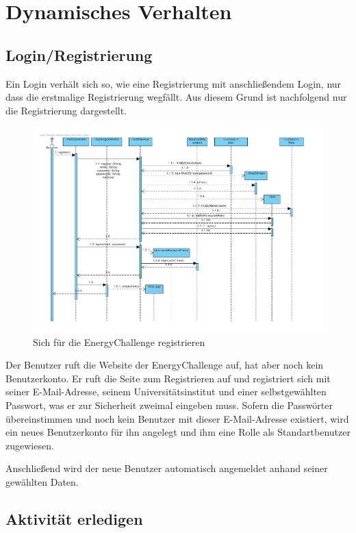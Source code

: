 \section{Dynamisches Verhalten}

\subsection{Login/Registrierung}

Ein Login verhält sich so, wie eine Registrierung mit anschließendem Login, nur dass die erstmalige Registrierung wegfällt. Aus diesem Grund ist nachfolgend nur die Registrierung dargestellt.

\begin{figure}[H]
  \centering
  \includegraphics[width=\textwidth, clip]{gfx/registrieren}
  \caption{Sich für die EnergyChallenge registrieren}
\end{figure}

Der Benutzer ruft die Website der EnergyChallenge auf, hat aber noch kein Benutzerkonto. Er ruft die Seite zum Registrieren auf und registriert sich mit seiner E-Mail-Adresse, seinem Universitätsinstitut und einer selbstgewählten Passwort, was er zur Sicherheit zweimal eingeben muss. Sofern die Passwörter übereinstimmen und noch kein Benutzer mit dieser E-Mail-Adresse existiert, wird ein neues Benutzerkonto für ihn angelegt und ihm eine Rolle als Standartbenutzer zugewiesen.

Anschließend wird der neue Benutzer automatisch angemeldet anhand seiner gewählten Daten.

\subsection{Aktivität erledigen}

